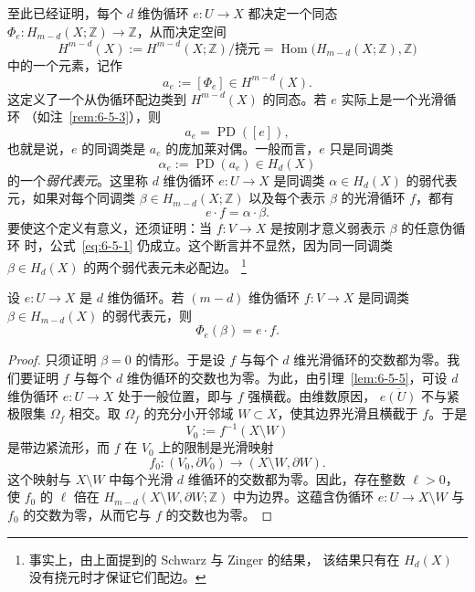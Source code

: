 至此已经证明，每个 $d$ 维伪循环 $e:U\to X$ 都决定一个同态
$\Phi_e:H_{m-d}(X;\mathbb Z)\to\mathbb Z$，从而决定空间
\[
  H^{m-d}(X)
  :=H^{m-d}(X;\mathbb Z)\big/\text{挠元}
  =\operatorname{Hom}\bigl(H_{m-d}(X;\mathbb Z),\mathbb Z\bigr)
\]
中的一个元素，记作
\[
  a_e:=[\Phi_e]\in H^{m-d}(X).
\]
这定义了一个从伪循环配边类到 $H^{m-d}(X)$ 的同态。若 $e$ 实际上是一个光滑循环
（如注~\ref{rem:6-5-3}），则
\[
  a_e=\operatorname{PD}([e]),
\]
也就是说，$e$ 的同调类是 $a_e$ 的庞加莱对偶。一般而言，$e$ 只是同调类
\[
  \alpha_e:=\operatorname{PD}(a_e)\in H_d(X)
\]
的一个\emph{弱代表元}。这里称 $d$ 维伪循环 $e:U\to X$ 是同调类
$\alpha\in H_d(X)$ 的弱代表元，如果对每个同调类
$\beta\in H_{m-d}(X;\mathbb Z)$ 以及每个表示 $\beta$ 的光滑循环 $f$，都有
\[
  e\cdot f=\alpha\cdot\beta.
\]
要使这个定义有意义，还须证明：当 $f:V\to X$ 是按刚才意义弱表示 $\beta$ 的任意伪循环
时，公式~\eqref{eq:6-5-1} 仍成立。这个断言并不显然，因为同一同调类
$\beta\in H_d(X)$ 的两个弱代表元未必配边。
\footnote{事实上，由上面提到的 Schwarz  与 Zinger  的结果，
该结果只有在 $H_d(X)$ 没有挠元时才保证它们配边。}

\begin{lemma}\label{lem:6-5-7}
设 $e:U\to X$ 是 $d$ 维伪循环。若 $(m-d)$ 维伪循环 $f:V\to X$ 是同调类
$\beta\in H_{m-d}(X)$ 的弱代表元，则
\[
  \Phi_e(\beta)=e\cdot f.
\]
\end{lemma}

\begin{proof}
只须证明 $\beta=0$ 的情形。于是设 $f$ 与每个 $d$ 维光滑循环的交数都为零。我们要证明
$f$ 与每个 $d$ 维伪循环的交数也为零。为此，由引理~\ref{lem:6-5-5}，可设
$d$ 维伪循环 $e:U\to X$ 处于一般位置，即与 $f$ 强横截。由维数原因，
$\overline{e(U)}$ 不与紧极限集 $\Omega_f$ 相交。取 $\Omega_f$ 的充分小开邻域
$W\subset X$，使其边界光滑且横截于 $f$。于是
\[
  V_0:=f^{-1}(X\setminus W)
\]
是带边紧流形，而 $f$ 在 $V_0$ 上的限制是光滑映射
\[
  f_0:(V_0,\partial V_0)\longrightarrow(X\setminus W,\partial W).
\]
这个映射与 $X\setminus W$ 中每个光滑 $d$ 维循环的交数都为零。因此，存在整数
$\ell>0$，使 $f_0$ 的 $\ell$ 倍在
$H_{m-d}(X\setminus W,\partial W;\mathbb Z)$ 中为边界。这蕴含伪循环
$e:U\to X\setminus W$ 与 $f_0$ 的交数为零，从而它与 $f$ 的交数也为零。
\end{proof}

